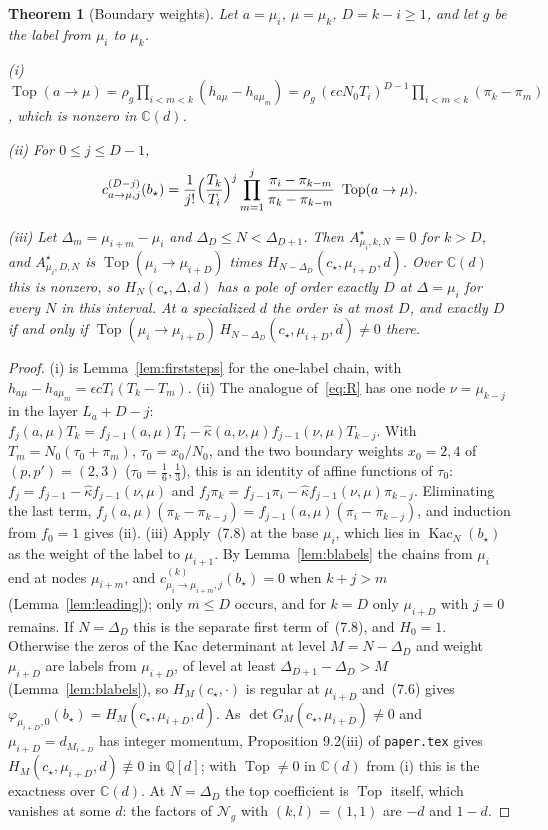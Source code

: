 \documentclass[11pt]{article}
\newtheorem{theorem}{Theorem}
\theoremstyle{remark}
\begin{document}
\begin{theorem}[Boundary weights]\label{thm:boundary}
Let $a=\mu_i$, $\mu=\mu_k$, $D=k-i\ge1$, and let $g$ be the label from
$\mu_i$ to $\mu_k$.

\noindent(i) $\operatorname{Top}(a\to\mu)=\rho_g\prod_{i<m<k}(h_{a\mu}-h_{a\mu_m})
 =\rho_g\,(\epsilon cN_0T_i)^{D-1}\prod_{i<m<k}(\pi_k-\pi_m)$, which is nonzero in
$\mathbb C(d)$.

\noindent(ii) For $0\le j\le D-1$,
\[
 c^{(D-j)}_{a\to\mu,j}(b_\star)=\frac1{j!}\Bigl(\frac{T_k}{T_i}\Bigr)^{j}
 \prod_{m=1}^{j}\frac{\pi_i-\pi_{k-m}}{\pi_k-\pi_{k-m}}\ \operatorname{Top}(a\to\mu).
\]

\noindent(iii) Let $\Delta_m=\mu_{i+m}-\mu_i$ and $\Delta_D\le N<\Delta_{D+1}$.
Then $A^\star_{\mu_i,k,N}=0$ for $k>D$, and $A^\star_{\mu_i,D,N}$ is
$\operatorname{Top}(\mu_i\to\mu_{i+D})$ times
$H_{N-\Delta_D}(c_\star,\mu_{i+D},d)$.  Over $\mathbb C(d)$ this is nonzero, so
$H_N(c_\star,\Delta,d)$ has a pole of order exactly $D$ at $\Delta=\mu_i$ for
every $N$ in this interval.  At a specialized $d$ the order is at most $D$, and
exactly $D$ if and only if $\operatorname{Top}(\mu_i\to\mu_{i+D})\,
H_{N-\Delta_D}(c_\star,\mu_{i+D},d)\ne0$ there.
\end{theorem}

\begin{proof}
(i) is Lemma~\ref{lem:firststeps} for the one-label chain, with
$h_{a\mu}-h_{a\mu_m}=\epsilon cT_i(T_k-T_m)$.  (ii) The analogue of~\eqref{eq:R}
has one node $\nu=\mu_{k-j}$ in the layer $L_a+D-j$:
$f_j(a,\mu)T_k=f_{j-1}(a,\mu)T_i-\hat\kappa(a,\nu,\mu)f_{j-1}(\nu,\mu)T_{k-j}$.
With $T_m=N_0(\tau_0+\pi_m)$, $\tau_0=x_0/N_0$, and the two boundary weights
$x_0=2,4$ of $(p,p')=(2,3)$ ($\tau_0=\frac16,\frac13$), this is an identity of
affine functions of $\tau_0$: $f_j=f_{j-1}-\hat\kappa f_{j-1}(\nu,\mu)$ and
$f_j\pi_k=f_{j-1}\pi_i-\hat\kappa f_{j-1}(\nu,\mu)\pi_{k-j}$.  Eliminating the
last term, $f_j(a,\mu)(\pi_k-\pi_{k-j})=f_{j-1}(a,\mu)(\pi_i-\pi_{k-j})$, and
induction from $f_0=1$ gives (ii).  (iii) Apply~(7.8) at the base $\mu_i$, which
lies in $\operatorname{Kac}_N(b_\star)$ as the weight of the label to $\mu_{i+1}$.
By Lemma~\ref{lem:blabels} the chains from $\mu_i$ end at nodes $\mu_{i+m}$, and
$c^{(k)}_{\mu_i\to\mu_{i+m},j}(b_\star)=0$ when $k+j>m$ (Lemma~\ref{lem:leading});
only $m\le D$ occurs, and for $k=D$ only $\mu_{i+D}$ with $j=0$ remains.  If
$N=\Delta_D$ this is the separate first term of~(7.8), and $H_0=1$.  Otherwise
the zeros of the Kac determinant at level $M=N-\Delta_D$ and weight $\mu_{i+D}$
are labels from $\mu_{i+D}$, of level at least $\Delta_{D+1}-\Delta_D>M$
(Lemma~\ref{lem:blabels}), so $H_M(c_\star,\cdot)$ is regular at $\mu_{i+D}$
and~(7.6) gives $\varphi_{\mu_{i+D},0}(b_\star)=H_M(c_\star,\mu_{i+D},d)$.  As
$\det G_M(c_\star,\mu_{i+D})\ne0$ and $\mu_{i+D}=d_{M_{i+D}}$ has integer
momentum, Proposition 9.2(iii) of \texttt{paper.tex} gives
$H_M(c_\star,\mu_{i+D},d)\not\equiv0$ in $\mathbb Q[d]$; with
$\operatorname{Top}\ne0$ in $\mathbb C(d)$ from (i) this is the exactness over
$\mathbb C(d)$.  At $N=\Delta_D$ the top coefficient is $\operatorname{Top}$ itself,
which vanishes at some $d$: the factors of $\mathcal N_g$ with $(k,l)=(1,1)$ are
$-d$ and $1-d$.
\end{proof}
\end{document}
